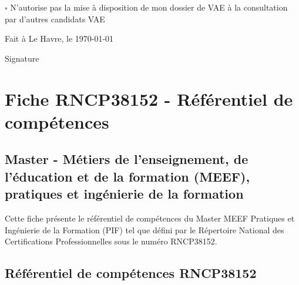 \documentclass[12pt,a4paper]{report}
\begin{document}
\vspace{0.5cm}

$\square$ N'autorise pas la mise à disposition de mon dossier de VAE à la consultation par d'autres candidats VAE

\vspace{2cm}

Fait à Le Havre, le \today

\vspace{1.5cm}

Signature

\vspace{2cm}



\newpage


\chapter*{Fiche RNCP38152 - Référentiel de compétences}

\section*{Master - Métiers de l'enseignement, de l'éducation et de la formation (MEEF), pratiques et ingénierie de la formation}

Cette fiche présente le référentiel de compétences du Master MEEF Pratiques et Ingénierie de la Formation (PIF) tel que défini par le Répertoire National des Certifications Professionnelles sous le numéro RNCP38152.

\section*{Référentiel de compétences RNCP38152}
\end{document}
